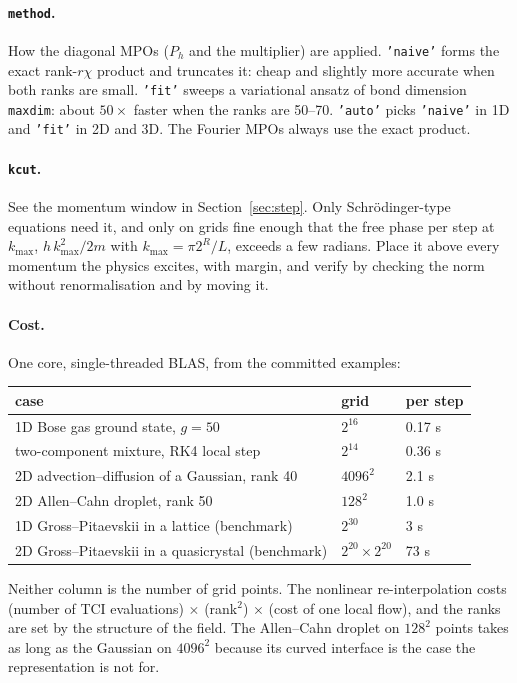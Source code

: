 \documentclass[11pt,a4paper]{article}
\newcommand{\code}[1]{\texttt{#1}}
\newcommand{\kmax}{k_{\max}}
\begin{document}
\paragraph{\code{method}.} How the diagonal MPOs ($P_h$ and the multiplier) are applied.
\code{'naive'} forms the exact rank-$r\chi$ product and truncates it: cheap and slightly
more accurate when both ranks are small. \code{'fit'} sweeps a variational ansatz of
bond dimension \code{maxdim}: about $50\times$ faster when the ranks are 50--70.
\code{'auto'} picks \code{'naive'} in 1D and \code{'fit'} in 2D and 3D. The Fourier MPOs
always use the exact product.

\paragraph{\code{kcut}.} See the momentum window in Section~\ref{sec:step}. Only
Schr\"odinger-type equations need it, and only on grids fine enough that the free
phase per step at $\kmax$, $h\,\kmax^2/2m$ with $\kmax=\pi2^R/L$, exceeds a few radians.
Place it above every momentum the physics excites, with margin, and verify by checking
the norm without renormalisation and by moving it.

\paragraph{Cost.} One core, single-threaded BLAS, from the committed examples:

\begin{tabularx}{\textwidth}{@{}Lll@{}}
\toprule
case & grid & per step \\
\midrule
1D Bose gas ground state, $g=50$ & $2^{16}$ & 0.17 s \\
two-component mixture, RK4 local step & $2^{14}$ & 0.36 s \\
2D advection--diffusion of a Gaussian, rank 40 & $4096^2$ & 2.1 s \\
2D Allen--Cahn droplet, rank 50 & $128^2$ & 1.0 s \\
1D Gross--Pitaevskii in a lattice (benchmark) & $2^{30}$ & 3 s \\
2D Gross--Pitaevskii in a quasicrystal (benchmark) & $2^{20}\times2^{20}$ & 73 s \\
\bottomrule
\end{tabularx}

Neither column is the number of grid points. The nonlinear re-interpolation costs
(number of TCI evaluations) $\times$ (rank$^2$) $\times$ (cost of one local flow), and
the ranks are set by the structure of the field. The Allen--Cahn droplet on $128^2$
points takes as long as the Gaussian on $4096^2$ because its curved interface is the
case the representation is not for.
\end{document}
